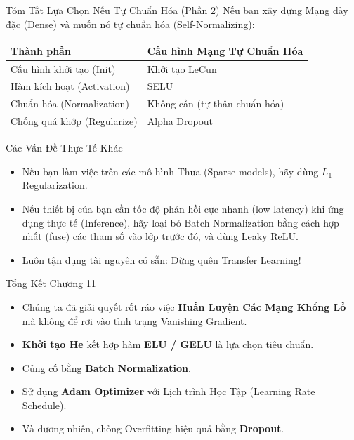 \documentclass[aspectratio=169]{beamer}
\begin{document}
\begin{frame}{Tóm Tắt Lựa Chọn Nếu Tự Chuẩn Hóa (Phần 2)}
    Nếu bạn xây dựng Mạng dày đặc (Dense) và muốn nó tự chuẩn hóa (Self-Normalizing):
    \begin{table}
        \centering
        \small
        \begin{tabular}{ll}
        \hline
        \textbf{Thành phần}           & \textbf{Cấu hình Mạng Tự Chuẩn Hóa}        \\ \hline
        Cấu hình khởi tạo (Init)      & Khởi tạo LeCun                             \\
        Hàm kích hoạt (Activation)    & SELU                                       \\
        Chuẩn hóa (Normalization)     & Không cần (tự thân chuẩn hóa)              \\
        Chống quá khớp (Regularize)   & Alpha Dropout                              \\ \hline
        \end{tabular}
    \end{table}
\end{frame}

\begin{frame}{Các Vấn Đề Thực Tế Khác}
    \begin{itemize}
        \item Nếu bạn làm việc trên các mô hình Thưa (Sparse models), hãy dùng $L_1$ Regularization.
        \item Nếu thiết bị của bạn cần tốc độ phản hồi cực nhanh (low latency) khi ứng dụng thực tế (Inference), hãy loại bỏ Batch Normalization bằng cách hợp nhất (fuse) các tham số vào lớp trước đó, và dùng Leaky ReLU.
        \item Luôn tận dụng tài nguyên có sẵn: Đừng quên Transfer Learning!
    \end{itemize}
\end{frame}

\begin{frame}{Tổng Kết Chương 11}
    \begin{itemize}
        \item Chúng ta đã giải quyết rốt ráo việc \textbf{Huấn Luyện Các Mạng Khổng Lồ} mà không để rơi vào tình trạng Vanishing Gradient.
        \item \textbf{Khởi tạo He} kết hợp hàm \textbf{ELU / GELU} là lựa chọn tiêu chuẩn.
        \item Củng cố bằng \textbf{Batch Normalization}.
        \item Sử dụng \textbf{Adam Optimizer} với Lịch trình Học Tập (Learning Rate Schedule).
        \item Và đương nhiên, chống Overfitting hiệu quả bằng \textbf{Dropout}.
    \end{itemize}
\end{frame}
\end{document}
